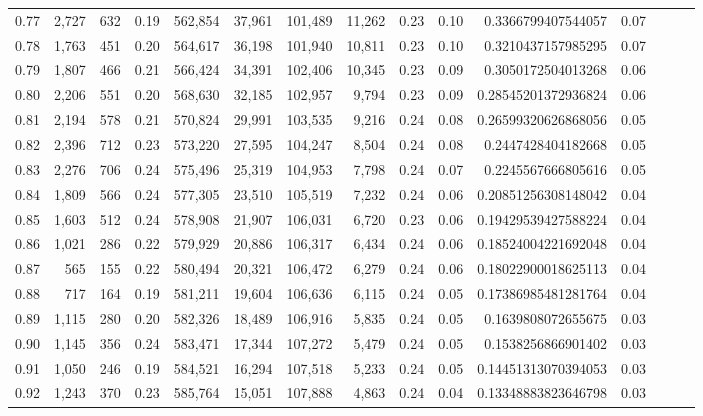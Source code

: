 \begin{tabular}{rrrrrrrrrrrrrrr}
0.77 &   2,727 &    632 &  0.19 &  562,854 &   37,961 &  101,489 &   11,262 &  0.23 &  0.10 &   0.3366799407544057 &      0.07 \\
0.78 &   1,763 &    451 &  0.20 &  564,617 &   36,198 &  101,940 &   10,811 &  0.23 &  0.10 &   0.3210437157985295 &      0.07 \\
0.79 &   1,807 &    466 &  0.21 &  566,424 &   34,391 &  102,406 &   10,345 &  0.23 &  0.09 &   0.3050172504013268 &      0.06 \\
0.80 &   2,206 &    551 &  0.20 &  568,630 &   32,185 &  102,957 &    9,794 &  0.23 &  0.09 &  0.28545201372936824 &      0.06 \\
0.81 &   2,194 &    578 &  0.21 &  570,824 &   29,991 &  103,535 &    9,216 &  0.24 &  0.08 &  0.26599320626868056 &      0.05 \\
0.82 &   2,396 &    712 &  0.23 &  573,220 &   27,595 &  104,247 &    8,504 &  0.24 &  0.08 &   0.2447428404182668 &      0.05 \\
0.83 &   2,276 &    706 &  0.24 &  575,496 &   25,319 &  104,953 &    7,798 &  0.24 &  0.07 &   0.2245567666805616 &      0.05 \\
0.84 &   1,809 &    566 &  0.24 &  577,305 &   23,510 &  105,519 &    7,232 &  0.24 &  0.06 &  0.20851256308148042 &      0.04 \\
0.85 &   1,603 &    512 &  0.24 &  578,908 &   21,907 &  106,031 &    6,720 &  0.23 &  0.06 &  0.19429539427588224 &      0.04 \\
0.86 &   1,021 &    286 &  0.22 &  579,929 &   20,886 &  106,317 &    6,434 &  0.24 &  0.06 &  0.18524004221692048 &      0.04 \\
0.87 &     565 &    155 &  0.22 &  580,494 &   20,321 &  106,472 &    6,279 &  0.24 &  0.06 &  0.18022900018625113 &      0.04 \\
0.88 &     717 &    164 &  0.19 &  581,211 &   19,604 &  106,636 &    6,115 &  0.24 &  0.05 &  0.17386985481281764 &      0.04 \\
0.89 &   1,115 &    280 &  0.20 &  582,326 &   18,489 &  106,916 &    5,835 &  0.24 &  0.05 &   0.1639808072655675 &      0.03 \\
0.90 &   1,145 &    356 &  0.24 &  583,471 &   17,344 &  107,272 &    5,479 &  0.24 &  0.05 &   0.1538256866901402 &      0.03 \\
0.91 &   1,050 &    246 &  0.19 &  584,521 &   16,294 &  107,518 &    5,233 &  0.24 &  0.05 &  0.14451313070394053 &      0.03 \\
0.92 &   1,243 &    370 &  0.23 &  585,764 &   15,051 &  107,888 &    4,863 &  0.24 &  0.04 &  0.13348883823646798 &      0.03 \\

\end{tabular}
